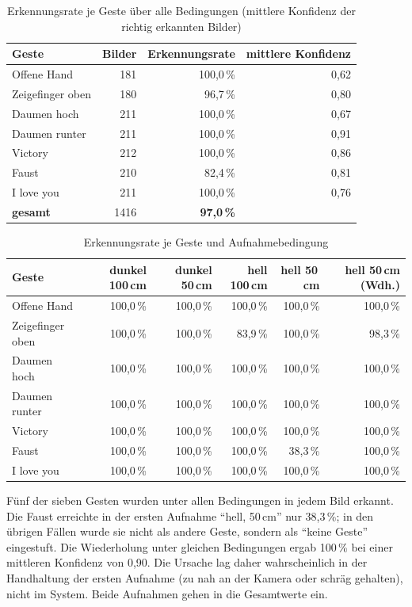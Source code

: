 \documentclass[11pt,a4paper]{article}
\begin{document}
\begin{table}[H]
\centering
\begin{tabular}{lrrr}
\toprule
Geste & Bilder & Erkennungsrate & mittlere Konfidenz \\
\midrule
Offene Hand & 181 & 100,0\,\% & 0,62 \\
Zeigefinger oben & 180 & 96,7\,\% & 0,80 \\
Daumen hoch & 211 & 100,0\,\% & 0,67 \\
Daumen runter & 211 & 100,0\,\% & 0,91 \\
Victory & 212 & 100,0\,\% & 0,86 \\
Faust & 210 & 82,4\,\% & 0,81 \\
I love you & 211 & 100,0\,\% & 0,76 \\
\midrule
\textbf{gesamt} & 1416 & \textbf{97,0\,\%} & \\
\bottomrule
\end{tabular}
\caption{Erkennungsrate je Geste über alle Bedingungen (mittlere Konfidenz der richtig erkannten Bilder)}
\end{table}

\begin{table}[H]
\centering
\small
\begin{tabular}{lrrrrr}
\toprule
Geste & dunkel 100\,cm & dunkel 50\,cm & hell 100\,cm & hell 50\,cm & hell 50\,cm (Wdh.) \\
\midrule
Offene Hand & 100,0\,\% & 100,0\,\% & 100,0\,\% & 100,0\,\% & 100,0\,\% \\
Zeigefinger oben & 100,0\,\% & 100,0\,\% & 83,9\,\% & 100,0\,\% & 98,3\,\% \\
Daumen hoch & 100,0\,\% & 100,0\,\% & 100,0\,\% & 100,0\,\% & 100,0\,\% \\
Daumen runter & 100,0\,\% & 100,0\,\% & 100,0\,\% & 100,0\,\% & 100,0\,\% \\
Victory & 100,0\,\% & 100,0\,\% & 100,0\,\% & 100,0\,\% & 100,0\,\% \\
Faust & 100,0\,\% & 100,0\,\% & 100,0\,\% & 38,3\,\% & 100,0\,\% \\
I love you & 100,0\,\% & 100,0\,\% & 100,0\,\% & 100,0\,\% & 100,0\,\% \\
\bottomrule
\end{tabular}
\caption{Erkennungsrate je Geste und Aufnahmebedingung}
\label{tab:bedingungen}
\end{table}

Fünf der sieben Gesten wurden unter allen Bedingungen in jedem Bild erkannt. Die Faust erreichte
in der ersten Aufnahme \enquote{hell, 50\,cm} nur 38,3\,\%; in den übrigen Fällen wurde sie
nicht als andere Geste, sondern als \enquote{keine Geste} eingestuft. Die Wiederholung unter
gleichen Bedingungen ergab 100\,\% bei einer mittleren Konfidenz von 0,90. Die Ursache lag daher
wahrscheinlich in der Handhaltung der ersten Aufnahme (zu nah an der Kamera oder schräg gehalten),
nicht im System. Beide Aufnahmen gehen in die Gesamtwerte ein.
\end{document}

